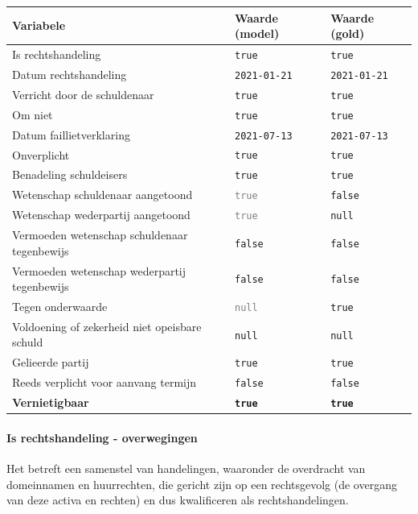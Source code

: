 \documentclass[
  dutch,
  a4paper,
]{article}
\begin{document}
\begin{center}
\small
\begin{tabular}{@{}p{7.4cm}p{2.6cm}p{2.6cm}@{}}
\toprule
Variabele & Waarde (model) & Waarde (gold) \\
\midrule
Is rechtshandeling & \texttt{true} & \texttt{true} \\
Datum rechtshandeling & \texttt{2021-01-21} & \texttt{2021-01-21} \\
Verricht door de schuldenaar & \texttt{true} & \texttt{true} \\
Om niet & \texttt{true} & \texttt{true} \\
Datum faillietverklaring & \texttt{2021-07-13} & \texttt{2021-07-13} \\
Onverplicht & \texttt{true} & \texttt{true} \\
Benadeling schuldeisers & \texttt{true} & \texttt{true} \\
Wetenschap schuldenaar aangetoond & \textcolor{gray}{\texttt{true}} & \texttt{false} \\
Wetenschap wederpartij aangetoond & \textcolor{gray}{\texttt{true}} & \texttt{null} \\
Vermoeden wetenschap schuldenaar tegenbewijs & \texttt{false} & \texttt{false} \\
Vermoeden wetenschap wederpartij tegenbewijs & \texttt{false} & \texttt{false} \\
Tegen onderwaarde & \textcolor{gray}{\texttt{null}} & \texttt{true} \\
Voldoening of zekerheid niet opeisbare schuld & \texttt{null} & \texttt{null} \\
Gelieerde partij & \texttt{true} & \texttt{true} \\
Reeds verplicht voor aanvang termijn & \texttt{false} & \texttt{false} \\
\textbf{Vernietigbaar} & \textbf{\texttt{true}} & \textbf{\texttt{true}} \\
\bottomrule
\end{tabular}
\end{center}

\paragraph{Is rechtshandeling - overwegingen}\label{is-rechtshandeling---overwegingen-20}

Het betreft een samenstel van handelingen, waaronder de overdracht van domeinnamen en huurrechten, die gericht zijn op een rechtsgevolg (de overgang van deze activa en rechten) en dus kwalificeren als rechtshandelingen.
\end{document}
